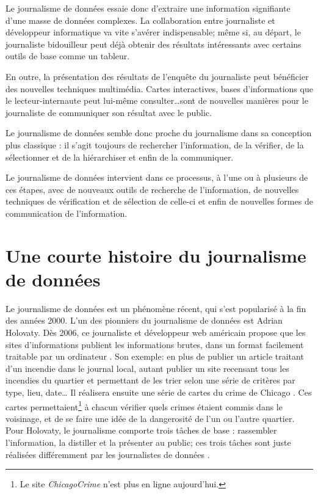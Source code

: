 Le journalisme de données essaie donc d'extraire une information signifiante 
d'une masse de données complexes. La collaboration entre journaliste et développeur 
informatique va vite s'avérer indispensable; même si, au départ, le journaliste \og 
bidouilleur \fg peut déjà obtenir des résultats intéressants avec certains outils de 
base comme un tableur.

En outre, la présentation des résultats de l'enquête du journaliste peut bénéficier 
des nouvelles techniques multimédia. Cartes interactives, bases d'informations
que le lecteur-internaute peut lui-même consulter\dots sont de nouvelles
manières pour le journaliste de communiquer son résultat avec le public. \cite{handbook,bradshaw}

Le journalisme de données semble donc proche du journalisme dans sa conception 
plus classique : il s'agit toujours de rechercher l'information, de la vérifier, 
de la sélectionner et de la hiérarchiser et enfin de la communiquer. 

Le journalisme de données intervient dans ce processus, à l'une ou à plusieurs de ces 
étapes, avec de nouveaux outils de recherche de l'information, de nouvelles 
techniques de vérification et de sélection de celle-ci et enfin de nouvelles 
formes de communication de l'information. \cite{handbook}


\section{Une courte histoire du journalisme de données}

Le journalisme de données est un phénomène récent, qui s'est popularisé à la
fin des années 2000. L'un des pionniers du journalisme de données est Adrian Holovaty. Dès 2006, 
ce journaliste et développeur web américain propose \cite{holovaty} que les sites d'informations publient les informations 
brutes, dans un format facilement traitable par un ordinateur \cite{handbookfr}.
Son exemple: en plus de publier un article traitant d'un incendie dans le 
journal local, autant publier un site recensant tous les incendies du quartier 
et permettant de les trier selon une série de critères par type, lieu, date\dots
Il réalisera ensuite une série de \og cartes du crime \fg de 
Chicago \cite{bradshaw}. Ces cartes permettaient\footnote{Le site \textit{ChicagoCrime} n'est plus en ligne aujourd'hui.} à chacun vérifier quels crimes étaient commis dans le voisinage, et de se faire une idée de la dangerosité de l'un ou l'autre quartier.
Pour Holovaty, le journalisme comporte trois tâches de base : rassembler l'information, la distiller et la présenter au public; ces trois tâches sont juste réalisées différemment par les journalistes de données \cite{bradshaw}.


